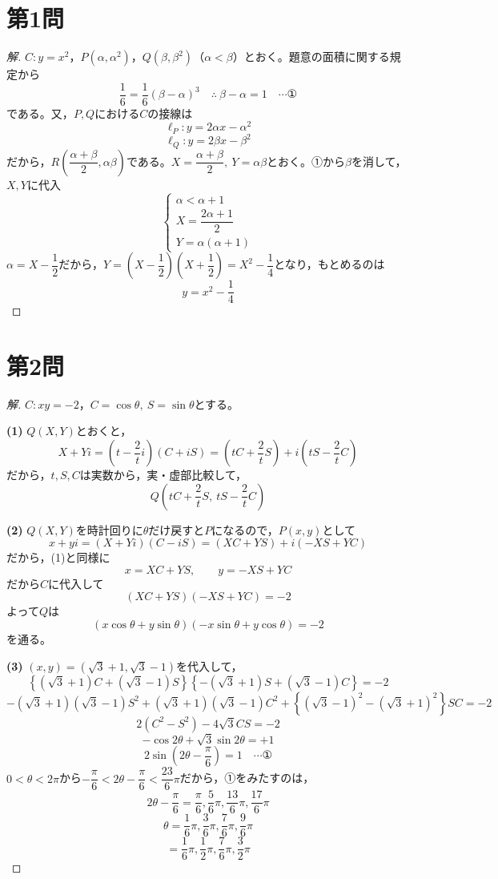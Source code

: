 \documentclass[../main.tex]{subfiles}
\begin{document}
\section*{第1問}

\begin{proof}[解]
  $C: y=x^2$，$P(\alpha,\alpha^2)$，$Q(\beta,\beta^2)$（$\alpha<\beta$）とおく。題意の面積に関する規定から
  \[
    \frac16=\frac16(\beta-\alpha)^3 \quad\therefore\ \beta-\alpha=1 \quad\cdots\text{①}
  \]
  である。又，$P,Q$における$C$の接線は
  \[
    \ell_P: y=2\alpha x-\alpha^2
  \]
  \[
    \ell_Q: y=2\beta x-\beta^2
  \]
  だから，$R\left(\dfrac{\alpha+\beta}{2},\alpha\beta\right)$である。$X=\dfrac{\alpha+\beta}{2},\ Y=\alpha\beta$とおく。①から$\beta$を消して，$X,Y$に代入
  \[
    \begin{cases}
      \alpha<\alpha+1 \\
      X=\dfrac{2\alpha+1}{2} \\
      Y=\alpha(\alpha+1)
    \end{cases}
  \]
  $\alpha=X-\dfrac12$だから，$Y=\left(X-\dfrac12\right)\left(X+\dfrac12\right)=X^2-\dfrac14$となり，もとめるのは
  \[
    y=x^2-\frac14
  \]
\end{proof}

\newpage

\section*{第2問}

\begin{proof}[解]
  $C: xy=-2$，$C=\cos\theta,\ S=\sin\theta$とする。

  \textbf{(1)} $Q(X,Y)$とおくと，
  \[
    X+Yi=\left(t-\frac2ti\right)(C+iS)=\left(tC+\frac2tS\right)+i\left(tS-\frac2tC\right)
  \]
  だから，$t,S,C$は実数から，実・虚部比較して，
  \[
    Q\left(tC+\frac2tS,\ tS-\frac2tC\right)
  \]

  \textbf{(2)} $Q(X,Y)$を時計回りに$\theta$だけ戻すと$P$になるので，$P(x,y)$として
  \[
    x+yi=(X+Yi)(C-iS)=(XC+YS)+i(-XS+YC)
  \]
  だから，(1)と同様に
  \[
    x=XC+YS, \qquad y=-XS+YC
  \]
  だから$C$に代入して
  \[
    (XC+YS)(-XS+YC)=-2
  \]
  よって$Q$は
  \[
    (x\cos\theta+y\sin\theta)(-x\sin\theta+y\cos\theta)=-2
  \]
  を通る。

  \textbf{(3)} $(x,y)=(\sqrt3+1,\sqrt3-1)$を代入して，
  \[
    \left\{(\sqrt3+1)C+(\sqrt3-1)S\right\}\left\{-(\sqrt3+1)S+(\sqrt3-1)C\right\}=-2
  \]
  \[
    -(\sqrt3+1)(\sqrt3-1)S^2+(\sqrt3+1)(\sqrt3-1)C^2+\left\{(\sqrt3-1)^2-(\sqrt3+1)^2\right\}SC=-2
  \]
  \[
    2(C^2-S^2)-4\sqrt3CS=-2
  \]
  \[
    -\cos2\theta+\sqrt3\sin2\theta=+1
  \]
  \[
    2\sin\left(2\theta-\frac{\pi}{6}\right)=1 \quad\cdots\text{①}
  \]
  $0<\theta<2\pi$から$-\dfrac{\pi}{6}<2\theta-\dfrac{\pi}{6}<\dfrac{23}{6}\pi$だから，①をみたすのは，
  \[
    2\theta-\frac{\pi}{6}=\frac{\pi}{6},\frac{5}{6}\pi,\frac{13}{6}\pi,\frac{17}{6}\pi
  \]
  \[
    \theta=\frac16\pi,\frac36\pi,\frac76\pi,\frac96\pi
  \]
  \[
    =\frac16\pi,\frac12\pi,\frac76\pi,\frac32\pi
  \]
\end{proof}
\end{document}
